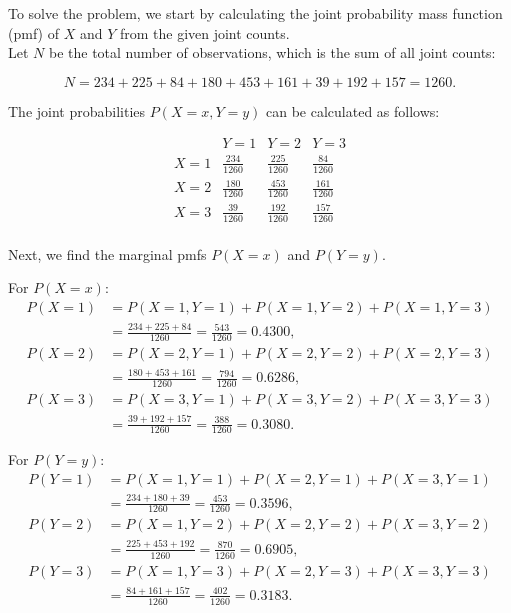\begin{solution}
To solve the problem, we start by calculating the joint probability mass function (pmf) of \(X\) and \(Y\) from the given joint counts.\\

Let \(N\) be the total number of observations, which is the sum of all joint counts:

\[
N = 234 + 225 + 84 + 180 + 453 + 161 + 39 + 192 + 157 = 1260.
\]

The joint probabilities \(P(X=x, Y=y)\) can be calculated as follows:

\[
\renewcommand{\arraystretch}{1.5} %
\begin{array}{c|c|c|c}
& Y=1 & Y=2 & Y=3 \\
\hline
X=1 & \frac{234}{1260} & \frac{225}{1260} & \frac{84}{1260} \\
\hline
X=2 & \frac{180}{1260} & \frac{453}{1260} & \frac{161}{1260} \\
\hline
X=3 & \frac{39}{1260} & \frac{192}{1260} & \frac{157}{1260} \\
\end{array}
\]

Next, we find the marginal pmfs \(P(X = x)\) and \(P(Y = y)\).

For \(P(X = x)\):
\[
\begin{aligned}
P(X = 1) & = P(X = 1, Y = 1) + P(X = 1, Y = 2) + P(X = 1, Y = 3) \\
          & = \frac{234 + 225 + 84}{1260} = \frac{543}{1260} = 0.4300, \\
P(X = 2) & = P(X = 2, Y = 1) + P(X = 2, Y = 2) + P(X = 2, Y = 3) \\
          & = \frac{180 + 453 + 161}{1260} = \frac{794}{1260} = 0.6286, \\
P(X = 3) & = P(X = 3, Y = 1) + P(X = 3, Y = 2) + P(X = 3, Y = 3) \\
          & = \frac{39 + 192 + 157}{1260} = \frac{388}{1260} = 0.3080.
\end{aligned}
\]

For \(P(Y = y)\):
\[
\begin{aligned}
P(Y = 1) & = P(X = 1, Y = 1) + P(X = 2, Y = 1) + P(X = 3, Y = 1) \\
          & = \frac{234 + 180 + 39}{1260} = \frac{453}{1260} = 0.3596, \\
P(Y = 2) & = P(X = 1, Y = 2) + P(X = 2, Y = 2) + P(X = 3, Y = 2) \\
          & = \frac{225 + 453 + 192}{1260} = \frac{870}{1260} = 0.6905, \\
P(Y = 3) & = P(X = 1, Y = 3) + P(X = 2, Y = 3) + P(X = 3, Y = 3) \\
          & = \frac{84 + 161 + 157}{1260} = \frac{402}{1260} = 0.3183.
\end{aligned}
\]


\end{solution}
